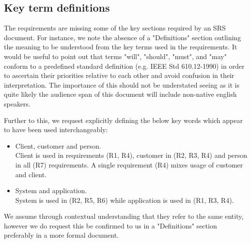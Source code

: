 

\subsection{Key term definitions}
The requirements are missing some of the key sections required by an SRS document.
For instance, we note the absence of a "Definitions" section outlining the meaning to be understood from the key terms used in the requirements.
It would be useful to point out that terms "will", "should", "must", and "may" conform to a predefined standard definition (e.g. IEEE Std 610.12-1990) in order to ascertain their priorities relative to each other and avoid confusion in their interpretation. 
The importance of this should not be understated seeing as it is quite likely the audience span of this document will include non-native english speakers. 

Further to this, we request explicitly defining the below key words which  appear to have been used interchangeably:  

\begin{itemize} 
	\item Client, customer and person. \\
	Client is used in requirements (R1, R4), customer in (R2, R3, R4) and person in all (R7) requirements.  A single requirement (R4) mixes usage of customer and client. 
	\item System and application.\\
	System is used in (R2, R5, R6) while application is used in (R1, R3, R4).
\end{itemize}

We assume through contextual understanding that they refer to the same entity, however we do request this be confirmed to us in a "Definitions" section preferably in a more formal document.

